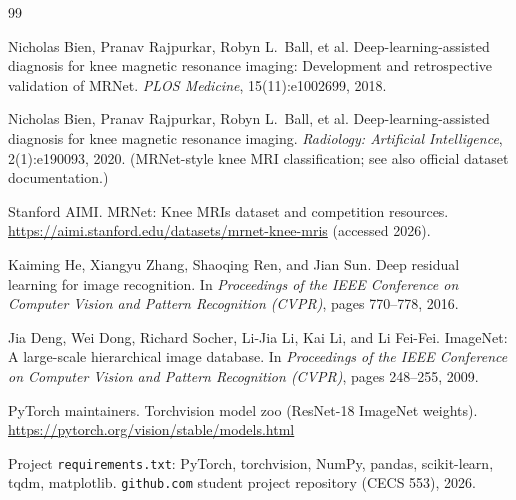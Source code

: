 \documentclass[10pt,twocolumn]{article}
\begin{document}

\begin{thebibliography}{99}

Nicholas Bien, Pranav Rajpurkar, Robyn L.\ Ball, et al.
\newblock Deep-learning-assisted diagnosis for knee magnetic resonance imaging: Development and retrospective validation of MRNet.
\newblock \emph{PLOS Medicine}, 15(11):e1002699, 2018.

Nicholas Bien, Pranav Rajpurkar, Robyn L.\ Ball, et al.
\newblock Deep-learning-assisted diagnosis for knee magnetic resonance imaging.
\newblock \emph{Radiology: Artificial Intelligence}, 2(1):e190093, 2020.
\newblock (MRNet-style knee MRI classification; see also official dataset documentation.)

Stanford AIMI.
\newblock MRNet: Knee MRIs dataset and competition resources.
\newblock \url{https://aimi.stanford.edu/datasets/mrnet-knee-mris}
\newblock (accessed 2026).

Kaiming He, Xiangyu Zhang, Shaoqing Ren, and Jian Sun.
\newblock Deep residual learning for image recognition.
\newblock In \emph{Proceedings of the IEEE Conference on Computer Vision and Pattern Recognition (CVPR)}, pages 770--778, 2016.

Jia Deng, Wei Dong, Richard Socher, Li-Jia Li, Kai Li, and Li Fei-Fei.
\newblock ImageNet: A large-scale hierarchical image database.
\newblock In \emph{Proceedings of the IEEE Conference on Computer Vision and Pattern Recognition (CVPR)}, pages 248--255, 2009.

PyTorch maintainers.
\newblock Torchvision model zoo (ResNet-18 ImageNet weights).
\newblock \url{https://pytorch.org/vision/stable/models.html}

Project \texttt{requirements.txt}: PyTorch, torchvision, NumPy, pandas, scikit-learn, tqdm, matplotlib.
\newblock \texttt{github.com} student project repository (CECS 553), 2026.

\end{thebibliography}
\end{document}

